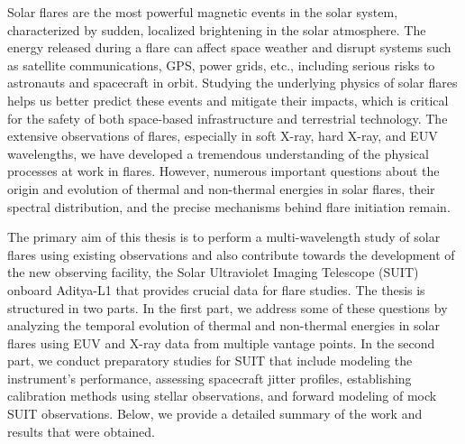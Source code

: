 Solar flares are the most powerful magnetic events in the solar system, characterized by sudden, localized brightening in the solar atmosphere. %
The energy released during a flare can affect space weather and disrupt systems such as satellite communications, GPS, power grids, etc., including serious risks to astronauts and spacecraft in orbit. Studying the underlying physics of solar flares helps us better predict these events and mitigate their impacts, which is critical for the safety of both space-based infrastructure and terrestrial technology. %
The extensive observations of flares, especially in soft X-ray, hard X-ray, and EUV wavelengths, we have developed a tremendous understanding of the physical processes at work in flares. However, numerous important questions about the origin and evolution of thermal and non-thermal energies in solar flares, their spectral distribution, and the precise mechanisms behind flare initiation remain. 

The primary aim of this thesis is to perform a multi-wavelength study of solar flares using existing observations and also contribute towards the development of the new observing facility, the Solar Ultraviolet Imaging Telescope (SUIT) onboard Aditya-L1 that provides crucial data for flare studies. The thesis is structured in two parts. In the first part, we address some of these questions by analyzing the temporal evolution of thermal and non-thermal energies in solar flares using EUV and X-ray data from multiple vantage points. In the second part, we conduct preparatory studies for SUIT that include modeling the instrument's performance, assessing spacecraft jitter profiles, establishing calibration methods using stellar observations, and forward modeling of mock SUIT observations. Below, we provide a detailed summary of the work and results that were obtained. %

